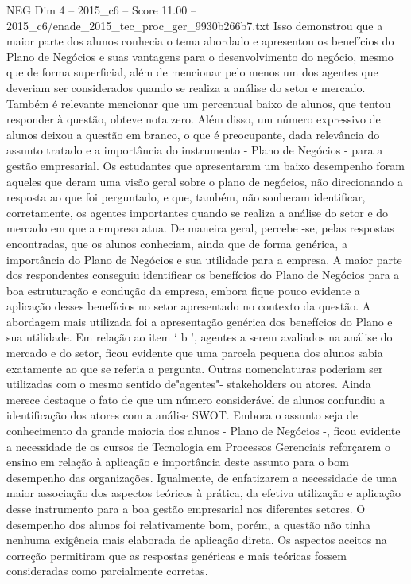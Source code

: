 \begin{textsample}{NEG Dim 4 – 2015\_c6 – Score 11.00 – 2015\_c6/enade\_2015\_tec\_proc\_ger\_9930b266b7.txt}
Isso demonstrou que a maior parte dos alunos conhecia o tema abordado e apresentou os benefícios do Plano de Negócios e suas vantagens para o desenvolvimento do negócio, mesmo que de forma superficial, além de mencionar pelo menos um dos agentes que deveriam ser considerados quando se realiza a análise do setor e mercado.
Também é relevante mencionar que um percentual baixo de alunos, que tentou responder à questão, obteve nota zero.
Além disso, um número expressivo de alunos deixou a questão em branco, o que é preocupante, dada relevância do assunto tratado e a importância do instrumento - Plano de Negócios - para a gestão empresarial.
Os estudantes que apresentaram um baixo desempenho foram aqueles que deram uma visão geral sobre o plano de negócios, não direcionando a resposta ao que foi perguntado, e que, também, não souberam identificar, corretamente, os agentes importantes quando se realiza a análise do setor e do mercado em que a empresa atua.
De maneira geral, percebe -se, pelas respostas encontradas, que os alunos conheciam, ainda que de forma genérica, a importância do Plano de Negócios e sua utilidade para a empresa.
A maior parte dos respondentes conseguiu identificar os benefícios do Plano de Negócios para a boa estruturação e condução da empresa, embora fique pouco evidente a aplicação desses benefícios no setor apresentado no contexto da questão.
A abordagem mais utilizada foi a apresentação genérica dos benefícios do Plano e sua utilidade.
Em relação ao item ‘ b ’, agentes a serem avaliados na análise do mercado e do setor, ficou evidente que uma parcela pequena dos alunos sabia exatamente ao que se referia a pergunta.
Outras nomenclaturas poderiam ser utilizadas com o mesmo sentido de"agentes"- stakeholders ou atores.
Ainda merece destaque o fato de que um número considerável de alunos confundiu a identificação dos atores com a análise SWOT.
Embora o assunto seja de conhecimento da grande maioria dos alunos - Plano de Negócios -, ficou evidente a necessidade de os cursos de Tecnologia em Processos Gerenciais reforçarem o ensino em relação à aplicação e importância deste assunto para o bom desempenho das organizações.
Igualmente, de enfatizarem a necessidade de uma maior associação dos aspectos teóricos à prática, da efetiva utilização e aplicação desse instrumento para a boa gestão empresarial nos diferentes setores.
O desempenho dos alunos foi relativamente bom, porém, a questão não tinha nenhuma exigência mais elaborada de aplicação direta.
Os aspectos aceitos na correção permitiram que as respostas genéricas e mais teóricas fossem consideradas como parcialmente corretas.

\end{textsample}
